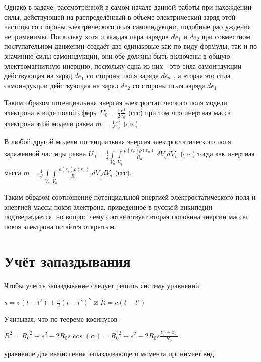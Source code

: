 \documentclass{article}
\begin{document}
Однако в задаче, рассмотренной в самом начале данной работы при нахождении силы, действующей на распределённый в объёме электрический заряд этой частицы со стороны электрического поля самоиндукции, подобные рассуждения неприменимы. Поскольку хотя и каждая пара зарядов $d{e}_{1}$ и $d{e}_{2}$ при совместном поступательном движении создаёт две одинаковые как по виду формулы, так и по значинию силы самоиндукции, они обе должны быть включены в общую электромагнитную инерцию, поскольку одна из них - это сила самоиндукции действующая на заряд $d{e}_{1}$  со стороны поля заряда $d{e}_{2}$ , а вторая это сила самоиндукции действующая на заряд $d{e}_{2}$  со стороны поля заряда $d{e}_{1}$.

Таким образом потенциальная энергия электростатического поля модели электрона в виде полой сферы 
${U}_{0} =\frac{1}{2}\frac{e^2}{{{r}_{0}}}$ (сгс)
при том что инертная масса электрона этой модели равна
$m =\frac{1}{{{c}^{^{2}}}}\frac{e^2}{{{r}_{0}}}$ (сгс).

В любой другой модели потенциальная энергия электростатического поля заряженной частицы равна
${U}_{0}=\frac{1}{2}\int\limits_{{{V}_{a}}}{\int\limits_{{{V}_{q}}}{\frac{\rho \left( {{r}_{q}} \right)\rho \left( {{r}_{a}} \right)}{R_{0}}}}\ d{{V}_{q}}d{{V}_{a}}$ (сгс)
тогда как инертная масса 
$m=\frac{1}{{{c}^{^{2}}}}\int\limits_{{{V}_{a}}}{\int\limits_{{{V}_{q}}}{\frac{\rho \left( {{r}_{q}} \right)\rho \left( {{r}_{a}} \right)}{R_{0}}}}\ d{{V}_{q}}d{{V}_{a}}$ (сгс).

Таким образом соотношение потенциальной энергией электростатического поля и энергией массы покоя электрона, приведенное в русской википедии подтверждается, но вопрос чему соответствует вторая половина энергии массы покоя электрона остаётся открытым.


\section{Учёт запаздывания}

Чтобы учесть запаздывание следует решить систему уравнений

$s=v\left( t-t' \right)+\frac{a}{2}{{\left( t-t' \right)}^{2}}$
и
$R=c\left( t-t' \right)$

Учитывая, что по теореме косинусов

${{R}^{2}}={{R}_{0}}^{2}+{{s}^{2}}-2{{R}_{0}}s\cos \left( \alpha  \right)={{R}_{0}}^{2}+{{s}^{2}}-2{{R}_{0}}s\frac{{{z}_{q'}}-{{z}_{a'}}}{{{R}_{0}}}$

уравнение для вычисления запаздывающего момента принимает вид
\end{document}
